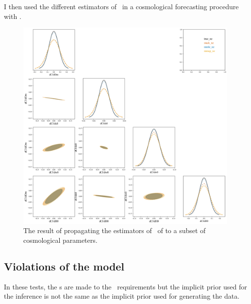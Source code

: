 I then used the different estimators of \nz\ in a cosmological forecasting procedure with \cosmolike.

\begin{figure}
	\begin{center}
		\includegraphics[width=0.99\textwidth]{figures/chippr/final_plot.png}
		\caption{The result of propagating the estimators of \nz\ of  to a subset of cosmological parameters.}
	\end{center}
\end{figure}



\subsection{Violations of the model}

In these tests, the \pzip s are made to the \lsst\ requirements but the implicit prior used for the inference is not the same as the implicit prior used for generating the data.

